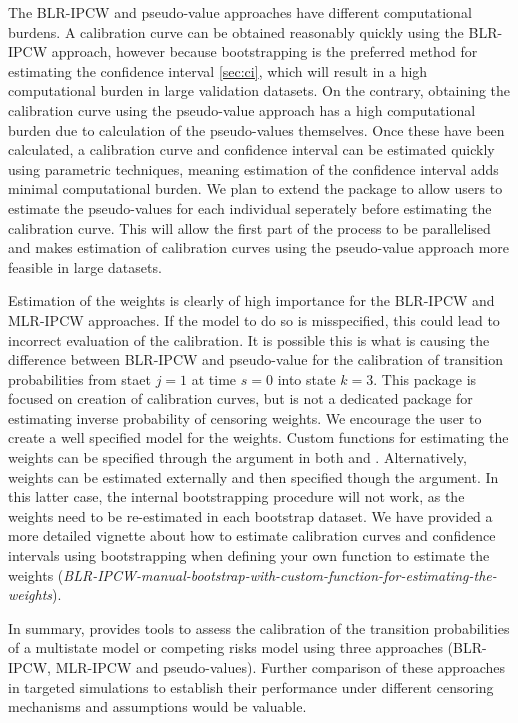 \documentclass[article,shortnames]{jss}
\begin{document}
The BLR-IPCW and pseudo-value approaches have different computational burdens. A calibration curve can be obtained reasonably quickly using the BLR-IPCW approach, however because bootstrapping is the preferred method for estimating the confidence interval \ref{sec:ci}, which will result in a high computational burden in large validation datasets. On the contrary, obtaining the calibration curve using the pseudo-value approach has a high computational burden due to calculation of the pseudo-values themselves. Once these have been calculated, a calibration curve and confidence interval can be estimated quickly using parametric techniques, meaning estimation of the confidence interval adds minimal computational burden. We plan to extend the package to allow users to estimate the pseudo-values for each individual seperately before estimating the calibration curve. This will allow the first part of the process to be parallelised and makes estimation of calibration curves using the pseudo-value approach more feasible in large datasets.

Estimation of the weights is clearly of high importance for the BLR-IPCW and MLR-IPCW approaches. If the model to do so is misspecified, this could lead to incorrect evaluation of the calibration. It is possible this is what is causing the difference between BLR-IPCW and pseudo-value for the calibration of transition probabilities from staet $j = 1$ at time $s = 0$ into state $k = 3$. This package is focused on creation of calibration curves, but is not a dedicated package for estimating inverse probability of censoring weights. We encourage the user to create a well specified model for the weights. Custom functions for estimating the weights can be specified through the  argument in both  and . Alternatively, weights can be estimated externally and then specified though the  argument. In this latter case, the internal bootstrapping procedure will not work, as the weights need to be re-estimated in each bootstrap dataset. We have provided a more detailed vignette about how to estimate calibration curves and confidence intervals using bootstrapping when defining your own function to estimate the weights (\emph{BLR-IPCW-manual-bootstrap-with-custom-function-for-estimating-the-weights}).

In summary,  provides tools to assess the calibration of the transition probabilities of a multistate model or competing risks model using three approaches (BLR-IPCW, MLR-IPCW and pseudo-values). Further comparison of these approaches in targeted simulations to establish their performance under different censoring mechanisms and assumptions would be valuable.
\end{document}
